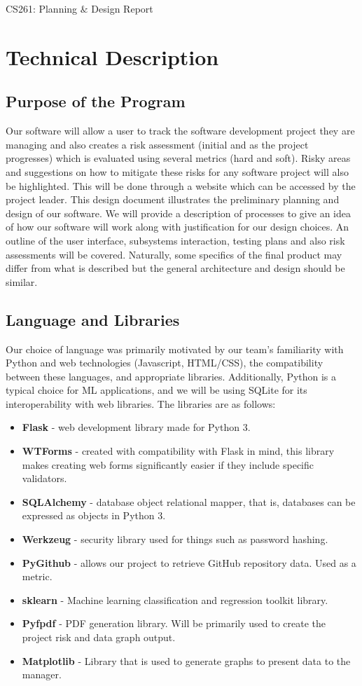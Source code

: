 \documentclass[a4paper]{article}
\theoremstyle{plain}
\theoremstyle{definition}
\theoremstyle{remark}
\begin{document}
\hline
\begin{center}
	\vspace{1mm}
	\Huge CS261: Planning $\&$ Design Report
\end{center}
\hline
\section*{Technical Description}
\subsection*{Purpose of the Program}
Our software will allow a user to track the software development project they are managing and also creates a risk assessment (initial and as the project progresses) which is evaluated using several metrics (hard and soft). Risky areas and suggestions on how to mitigate these risks for any software project will also be highlighted. This will be done through a website which can be accessed by the project leader. This design document illustrates the preliminary planning and design of our software. We will provide a description of processes to give an idea of how our software will work along with justification for our design choices. An outline of the user interface, subsystems interaction, testing plans and also risk assessments will be covered. Naturally, some specifics of the final product may differ from what is described but the general architecture and design should be similar.
\subsection*{Language and Libraries}
Our choice of language was primarily motivated by our team’s familiarity with Python and web technologies (Javascript, HTML/CSS), the compatibility between these languages, and appropriate libraries. Additionally, Python is a typical choice for ML applications, and we will be using SQLite for its interoperability with web libraries. The libraries are as follows:
		\begin{itemize}
			\item \textbf{Flask} - web development library made for Python 3.
			\item \textbf{WTForms} - created with compatibility with Flask in mind, this library makes creating web forms significantly easier if they include specific validators.
			\item \textbf{SQLAlchemy} - database object relational mapper, that is, databases can be expressed as objects in Python 3.
			\item \textbf{Werkzeug} - security library used for things such as password hashing.
			\item \textbf{PyGithub} - allows our project to retrieve GitHub repository data. Used as a metric.
			\item \textbf{sklearn} - Machine learning classification and regression toolkit library. 
			\item \textbf{Pyfpdf} - PDF generation library. Will be primarily used to create the project risk and data graph output.
			\item \textbf{Matplotlib} - Library that is used to generate graphs to present data to the manager.
		\end{itemize}
\end{document}
